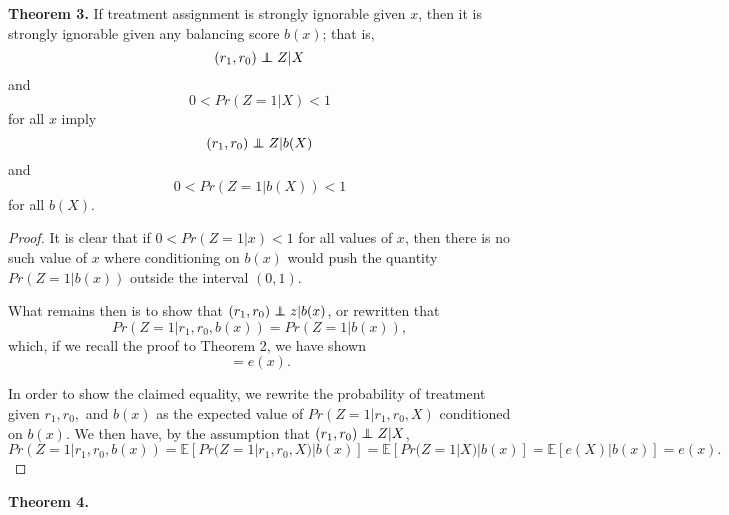 \documentclass{article}
\newcommand\independent{\protect\mathpalette{\protect\independenT}{\perp}}
\def\independenT#1#2{\mathrel{\rlap{$#1#2$}\mkern2mu{#1#2}}}
\newcommand{\E}[0]{\mathbb E}
\begin{document}
\textbf{Theorem 3.} If treatment assignment is strongly 
ignorable given $x$, then it is strongly ignorable
given any balancing score $b(x)$; that is,
$$(r_1, r_0) \independent Z | X$$
and
$$0 < Pr(Z=1 | X) < 1$$
for all $x$ imply 
$$(r_1, r_0) \independent Z | b(X)$$
and 
$$0 < Pr(Z = 1 | b(X)) < 1$$
for all $b(X)$.

\begin{proof}
    It is clear that if $0 < Pr(Z = 1|x) < 1$
    for all values of $x$, then there is no 
    such value of $x$ where conditioning on 
    $b(x)$ would push the quantity $Pr(Z=1|b(x))$
    outside the interval $(0,1)$. 

    What remains then is to show that $(r_1, r_0) \independent z | b(x)$, or rewritten that 
    $$Pr(Z=1 | r_1, r_0, b(x)) = Pr(Z=1 | b(x)),$$
    which, if we recall the proof to Theorem 2, we
    have shown $$ = e(x).$$ 

    In order to show the claimed equality, we rewrite
    the probability of treatment given $r_1, r_0,$ and $b(x)$ as the expected value of $Pr(Z=1 | r_1, r_0, X)$ conditioned on $b(x)$. 
    We then have, by the assumption that $(r_1, r_0) \independent Z | X$, 
    $$Pr(Z = 1 | r_1, r_0, b(x)) = \E[Pr(Z=1|r_1,r_0,X)|b(x)] = \E[Pr(Z=1|X)|b(x)] = 
    \E[e(X)|b(x)] = e(x).$$
\end{proof}

\textbf{Theorem 4.} 
\end{document}
